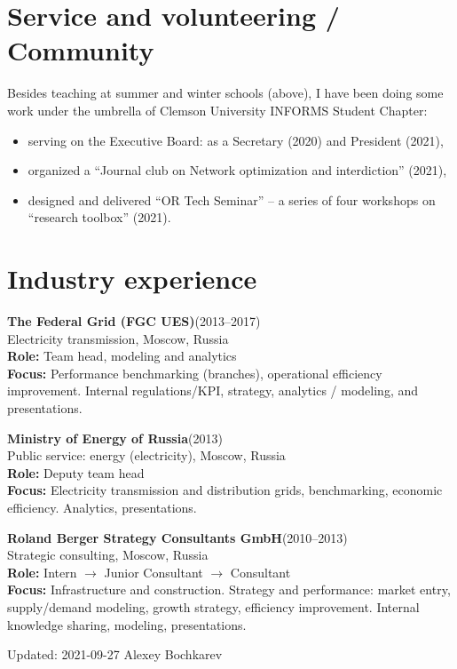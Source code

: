 \documentclass[11pt]{article} \usepackage{geometry} %
\newcommand{\jobl}[5]{%
  \textbf{#1}\hfill (#2)\\
  #3\vspace{0.25em}\\
  \textbf{Role:} #4\\
  \textbf{Focus:} #5}
\newcommand{\job}[5]{%
  \jobl{#1}{#2}{#3}{#4}{#5}\vspace{1.5em}
}
\newcommand{\lastupdate}{\vfill\hfill \tiny Updated: 2021-09-27\newline \hspace*{\fill} Alexey Bochkarev}
\begin{document}
   \section*{Service and volunteering / Community}
   Besides teaching at summer and winter schools (above), I have been doing some work under the umbrella of Clemson University INFORMS Student Chapter:
   \begin{itemize}
     \itemsep0pt
   \item serving on the Executive Board: as a Secretary (2020) and President
     (2021),
   \item organized a ``Journal club on Network optimization and interdiction''
     (2021),
   \item designed and delivered ``OR Tech Seminar'' -- a series of four
     workshops on ``research toolbox'' (2021). 
   \end{itemize}
   \vspace{0.3em}

   \section*{Industry experience}
   \job{The Federal Grid (FGC UES)}{2013--2017}{Electricity transmission,
     Moscow, Russia}{Team head, modeling and analytics}{Performance
     benchmarking (branches), operational efficiency improvement. Internal
     regulations/KPI, strategy, analytics / modeling, and presentations.}

   \noindent
   \job{Ministry of Energy of Russia}{2013}{Public service: energy
     (electricity), Moscow, Russia}{Deputy team head}{Electricity transmission and
     distribution grids, benchmarking, economic efficiency.
     Analytics, presentations.}

   \noindent
   \job{Roland Berger Strategy Consultants GmbH}{2010--2013}{Strategic consulting,
     Moscow, Russia}{ Intern $\rightarrow$ Junior
     Consultant $\rightarrow$ Consultant}{Infrastructure and construction.
     Strategy and performance: market entry, supply/demand modeling, growth
     strategy, efficiency improvement. Internal knowledge sharing, modeling, presentations.}

   \lastupdate
\end{document}
